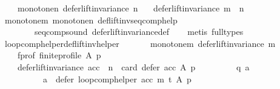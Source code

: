 \begin{isabellebody}
\ \ \ \ monotone{\isacharunderscore}{\kern0pt}n{\isacharcolon}{\kern0pt}\ {\isachardoublequoteopen}defer{\isacharunderscore}{\kern0pt}lift{\isacharunderscore}{\kern0pt}invariance\ n{\isachardoublequoteclose}\isanewline
\ \ \ {\isachardoublequoteopen}defer{\isacharunderscore}{\kern0pt}lift{\isacharunderscore}{\kern0pt}invariance\ {\isacharparenleft}{\kern0pt}m\ {\isasymtriangleright}\ n{\isacharparenright}{\kern0pt}{\isachardoublequoteclose}\isanewline
%
\isadelimproof
\ \ %
\endisadelimproof
%
\isatagproof
{}\isamarkupfalse%
\ monotone{\isacharunderscore}{\kern0pt}m\ monotone{\isacharunderscore}{\kern0pt}n\ def{\isacharunderscore}{\kern0pt}lift{\isacharunderscore}{\kern0pt}inv{\isacharunderscore}{\kern0pt}seq{\isacharunderscore}{\kern0pt}comp{\isacharunderscore}{\kern0pt}help\isanewline
\ \ \ \ \ \ \ \ seq{\isacharunderscore}{\kern0pt}comp{\isacharunderscore}{\kern0pt}sound\ defer{\isacharunderscore}{\kern0pt}lift{\isacharunderscore}{\kern0pt}invariance{\isacharunderscore}{\kern0pt}def\isanewline
\ \ \isamarkupfalse%
\ {\isacharparenleft}{\kern0pt}metis\ {\isacharparenleft}{\kern0pt}full{\isacharunderscore}{\kern0pt}types{\isacharparenright}{\kern0pt}{\isacharparenright}{\kern0pt}%
\endisatagproof
{\isafoldproof}%
%
\isadelimproof
\isanewline
%
\endisadelimproof
\isanewline
{}\isamarkupfalse%
\ loop{\isacharunderscore}{\kern0pt}comp{\isacharunderscore}{\kern0pt}helper{\isacharunderscore}{\kern0pt}def{\isacharunderscore}{\kern0pt}lift{\isacharunderscore}{\kern0pt}inv{\isacharunderscore}{\kern0pt}helper{\isacharcolon}{\kern0pt}\isanewline
\ \ \isanewline
\ \ \ \ monotone{\isacharunderscore}{\kern0pt}m{\isacharcolon}{\kern0pt}\ {\isachardoublequoteopen}defer{\isacharunderscore}{\kern0pt}lift{\isacharunderscore}{\kern0pt}invariance\ m{\isachardoublequoteclose}\ \isanewline
\ \ \ \ f{\isacharunderscore}{\kern0pt}prof{\isacharcolon}{\kern0pt}\ {\isachardoublequoteopen}finite{\isacharunderscore}{\kern0pt}profile\ A\ p{\isachardoublequoteclose}\isanewline
\ \ \isanewline
\ \ \ \ {\isachardoublequoteopen}{\isacharparenleft}{\kern0pt}defer{\isacharunderscore}{\kern0pt}lift{\isacharunderscore}{\kern0pt}invariance\ acc\ {\isasymand}\ n\ {\isacharequal}{\kern0pt}\ card\ {\isacharparenleft}{\kern0pt}defer\ acc\ A\ p{\isacharparenright}{\kern0pt}{\isacharparenright}{\kern0pt}\ {\isasymlongrightarrow}\isanewline
\ \ \ \ \ \ \ \ {\isacharparenleft}{\kern0pt}{\isasymforall}q\ a{\isachardot}{\kern0pt}\isanewline
\ \ \ \ \ \ \ \ \ \ {\isacharparenleft}{\kern0pt}a\ {\isasymin}\ {\isacharparenleft}{\kern0pt}defer\ {\isacharparenleft}{\kern0pt}loop{\isacharunderscore}{\kern0pt}comp{\isacharunderscore}{\kern0pt}helper\ acc\ m\ t{\isacharparenright}{\kern0pt}\ A\ p{\isacharparenright}{\kern0pt}\ {\isasymand}\isanewline

\end{isabellebody}
